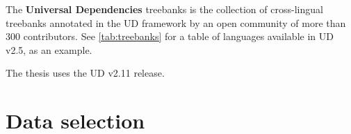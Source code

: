 The \textbf{Universal Dependencies} treebanks \citep{universaldep} is the collection of cross-lingual treebanks annotated in the UD framework by an open community of more than 300 contributors. See \ref{tab:treebanks} for a table of languages available in UD v2.5, as an example.



The thesis uses the UD v2.11 release.

\section{Data selection}\label{sec:data_selection}






